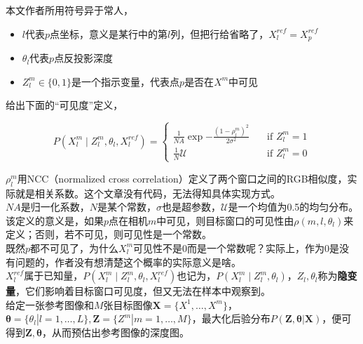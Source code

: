 本文作者所用符号异于常人，

\begin{itemize}
	\item $l$代表$p$点坐标，意义是某行中的第$l$列，但把行给省略了，$X_l^{ref} = X_p^{ref}$
	\item $\theta_l$代表$p$点反投影深度
	\item $Z_l^m \in\{0,1\}$是一个指示变量，代表点$p$是否在$X^m$中可见
\end{itemize}

给出下面的“可见度”定义，

\begin{equation}
	P\left(X_l^m\mid Z_l^m, \theta_l,X_l^{ref} \right) = 
	\begin{cases}
		\frac{1}{NA}\exp{-\frac{\left(1-\rho^m_l\right)^2}{2\sigma^2}}\quad& \text{if } Z_l^m=1\\
		\frac{1}{N}\mathcal{U}\quad & \text{if } Z_l^m=0
	\end{cases}\label{patch_similar}
\end{equation}

$\rho^m_l$用NCC（normalized cross correlation）定义了两个窗口之间的RGB相似度，实际就是相关系数。这个文章没有代码，无法得知具体实现方式。\\

$NA$是归一化系数，$N$是某个常数，$\sigma$也是超参数，$\mathcal{U}$是一个均值为0.5的均匀分布。\\

该定义的意义是，如果$p$点在相机$m$中可见，则目标窗口的可见性由$\rho\left(m,l,\theta_l\right)$来定义；否则，若不可见，则可见性是一个常数。\\

既然$p$都不可见了，为什么$X_l^m$可见性不是$0$而是一个常数呢？实际上，作为$0$是没有问题的，作者没有想清楚这个概率的实际意义是啥。\\

$X^{ref}_l$属于已知量，$P\left(X_l^m\mid Z_l^m, \theta_l,X_l^{ref} \right)$也记为，$P\left(X_l^m\mid Z_l^m, \theta_l\right)$，$Z_l,\theta_l$称为\textbf{隐变量}，它们影响着目标窗口可见度，但又无法在样本中观察到。\\

给定一张参考图像和$M$张目标图像$\mathbf{X}=\{X^1,\dots,X^m\}$，$\boldsymbol{\theta}=\{\theta_l|l=1,\dots,L\}, \mathbf{Z}=\{Z^m|m=1,\dots,M\}$，最大化后验分布$P(\mathbf{Z},\boldsymbol{\theta}|\mathbf{X})$，便可得到$\mathbf{Z},\boldsymbol{\theta}$，从而预估出参考图像的深度图。\\

